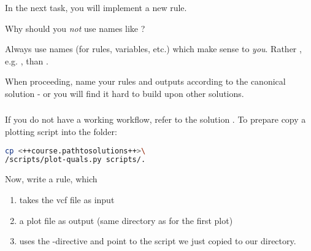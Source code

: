 \begin{frame}[fragile]
	\frametitle{}
	In the next task, you will implement a new rule.
	\begin{question}
		Why should you \emph{not} use names like ?
	\end{question}
    \pause
    \begin{docs}
    	Always use names (for rules, variables, etc.) which make sense to \emph{you}. Rather , e.g. , than .
    \end{docs}
    \pause
    \begin{hint}
    	When proceeding, name your rules and outputs according to the canonical solution - or you will find it hard to build upon other solutions.
    \end{hint}
\end{frame}

\begin{frame}[fragile]
	\frametitle{}
	If you do not have a working workflow, refer to the solution .\newline
	To prepare copy a plotting script into the  folder:
	\begin{lstlisting}[language=Bash, style=Shell, basicstyle=\footnotesize]
cp <++course.pathtosolutions++>\
/scripts/plot-quals.py scripts/.
    \end{lstlisting}
    Now, write a rule, which
    \begin{enumerate}
    	\item takes the vcf file as input
    	\item a plot file as output (same directory as for the first plot)
    	\item uses the \altverb{script}-directive and point to the script we just copied to our  directory.
    \end{enumerate}
\end{frame}

